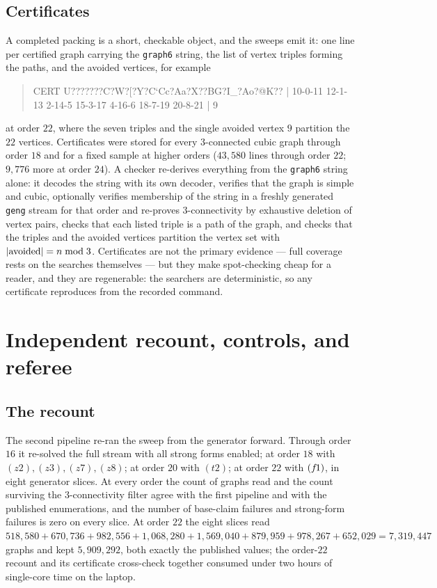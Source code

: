 \documentclass[11pt]{amsart}
\theoremstyle{plain}
\theoremstyle{definition}
\theoremstyle{remark}
\begin{document}
\subsection{Certificates}\label{ssec:certs}
A completed packing is a short, checkable object, and the sweeps emit it:
one line per certified graph carrying the \texttt{graph6} string, the
list of vertex triples forming the paths, and the avoided vertices, for
example
\begin{quote}\small\ttfamily\raggedright
CERT U???????C?W?[?Y?C`Cc?Aa?X??BG?I\_?Ao?@K?? | 10-0-11 12-1-13 2-14-5
15-3-17 4-16-6 18-7-19 20-8-21 | 9
\end{quote}
at order $22$, where the seven triples and the single avoided vertex $9$
partition the $22$ vertices. Certificates were stored for every
$3$-connected cubic graph through order $18$ and for a fixed sample at
higher orders ($43{,}580$ lines through order $22$; $9{,}776$ more at
order $24$). A checker re-derives everything from the \texttt{graph6}
string alone: it decodes the string with its own decoder, verifies that
the graph is simple and cubic, optionally verifies membership of the
string in a freshly generated \texttt{geng} stream for that order and
re-proves $3$-connectivity by exhaustive deletion of vertex pairs, checks
that each listed triple is a path of the graph, and checks that the
triples and the avoided vertices partition the vertex set with
$|{\rm avoided}| = n \bmod 3$. Certificates are not the primary evidence
--- full coverage rests on the searches themselves --- but they make
spot-checking cheap for a reader, and they are regenerable: the searchers
are deterministic, so any certificate reproduces from the recorded
command.

\section{Independent recount, controls, and referee}\label{sec:verif}

\subsection{The recount}\label{ssec:recount}
The second pipeline re-ran the sweep from the generator forward. Through
order $16$ it re-solved the full stream with all strong forms enabled;
at order $18$ with $(z2),(z3),(z7),(z8)$; at order $20$ with $(t2)$; at
order $22$ with $(f\mkern-2mu1)$, in eight generator slices. At every order the
count of graphs read and the count surviving the $3$-connectivity filter
agree with the first pipeline and with the published enumerations, and
the number of base-claim failures and strong-form failures is zero on
every slice. At order $22$ the eight slices read
$518{,}580 + 670{,}736 + 982{,}556 + 1{,}068{,}280 + 1{,}569{,}040 +
879{,}959 + 978{,}267 + 652{,}029 = 7{,}319{,}447$ graphs and kept
$5{,}909{,}292$, both exactly the published values; the order-$22$
recount and its certificate cross-check together consumed under two hours
of single-core time on the laptop.
\end{document}
